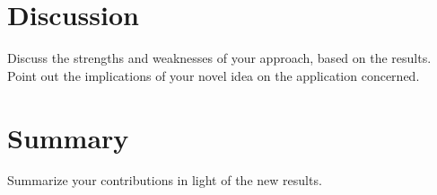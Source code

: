 \documentclass[10pt,conference,compsocconf]{IEEEtran}
\begin{document}
\section{Discussion}
  Discuss the strengths and weaknesses of your
  approach, based on the results. Point out the implications of your
  novel idea on the application concerned.
\section{Summary}
  Summarize your contributions in light of the new
  results.






\end{document}
